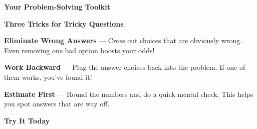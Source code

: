 \clearpage
\thispagestyle{empty}
{\sffamily

\begin{center}
{\fontsize{22}{26}\selectfont\bfseries\color{funOrange} \faTools\hspace{3mm}Your Problem-Solving Toolkit\hspace{3mm}\faTools}

\vspace{2mm}
{\color{funGray}\hrulefill}
\end{center}

\vspace{3mm}

\begin{tcolorbox}[
    enhanced,
    colback=funOrangeLight,
    colframe=funOrange!50,
    arc=10pt,
    boxrule=1.5pt,
    left=6mm, right=6mm, top=5mm, bottom=5mm,
]
{\large\bfseries\color{funOrangeDark} \faWrench\hspace{2mm}Three Tricks for Tricky Questions}

\vspace{3mm}

\textcolor{funOrange}{\faTimesCircle}\hspace{2mm}\textbf{Eliminate Wrong Answers} — Cross out choices that are obviously wrong. Even removing one bad option boosts your odds!

\vspace{3mm}

\textcolor{funOrange}{\faUndo}\hspace{2mm}\textbf{Work Backward} — Plug the answer choices back into the problem. If one of them works, you've found it!

\vspace{3mm}

\textcolor{funOrange}{\faCalculator}\hspace{2mm}\textbf{Estimate First} — Round the numbers and do a quick mental check. This helps you spot answers that are way off.
\end{tcolorbox}

\vspace{3mm}

\begin{tcolorbox}[
    enhanced,
    colback=funYellowLight,
    colframe=funYellow!60,
    arc=10pt,
    boxrule=1pt,
    left=6mm, right=6mm, top=4mm, bottom=4mm,
]
{\bfseries\color{funYellowDark} \faLightbulb\hspace{2mm}Try It Today}


\end{tcolorbox}}
